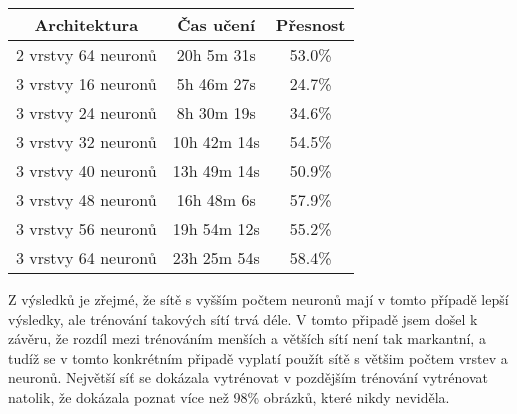 \begin{center}
    \begin{tabular}{||c c c||}
        \hline
        Architektura        & Čas učení   & Přesnost \\ [0.5ex]
        \hline\hline
        2 vrstvy 64 neuronů & 20h 5m 31s  & 53.0\%   \\
        \hline
        3 vrstvy 16 neuronů & 5h 46m 27s  & 24.7\%   \\
        \hline
        3 vrstvy 24 neuronů & 8h 30m 19s  & 34.6\%   \\
        \hline
        3 vrstvy 32 neuronů & 10h 42m 14s & 54.5\%   \\
        \hline
        3 vrstvy 40 neuronů & 13h 49m 14s & 50.9\%   \\
        \hline
        3 vrstvy 48 neuronů & 16h 48m 6s  & 57.9\%   \\
        \hline
        3 vrstvy 56 neuronů & 19h 54m 12s & 55.2\%   \\
        \hline
        3 vrstvy 64 neuronů & 23h 25m 54s & 58.4\%   \\
        \hline
    \end{tabular}
\end{center}

Z výsledků je zřejmé, že sítě s vyšším počtem neuronů mají v tomto případě lepší výsledky, ale trénování takových sítí trvá déle.
V tomto připadě jsem došel k závěru, že rozdíl mezi trénováním menších a větších sítí není tak markantní,
a tudíž se v tomto konkrétním připadě vyplatí použít sítě s většim počtem vrstev a neuronů.
Největší síť se dokázala vytrénovat v pozdějším trénování vytrénovat natolik, že dokázala poznat více než 98\% obrázků, které nikdy neviděla.